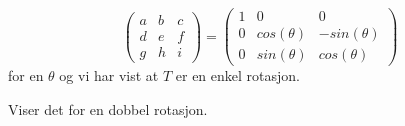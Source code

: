 \documentclass[a4paper,10pt,english]{article}
\begin{document}
$$
\left(
    \begin{matrix}
        a & b & c \\
        d & e & f \\
        g & h & i
    \end{matrix}
\right)
=
\left(
    \begin{matrix}
        1 & 0 & 0 \\
        0 & cos(\theta) & -sin(\theta) \\
        0 & sin(\theta) &  cos(\theta)
    \end{matrix}
\right)
$$
for en $\theta$ og vi har vist at $T$ er en enkel rotasjon.

Viser det for en dobbel rotasjon.

\printbibliography
\end{document}

